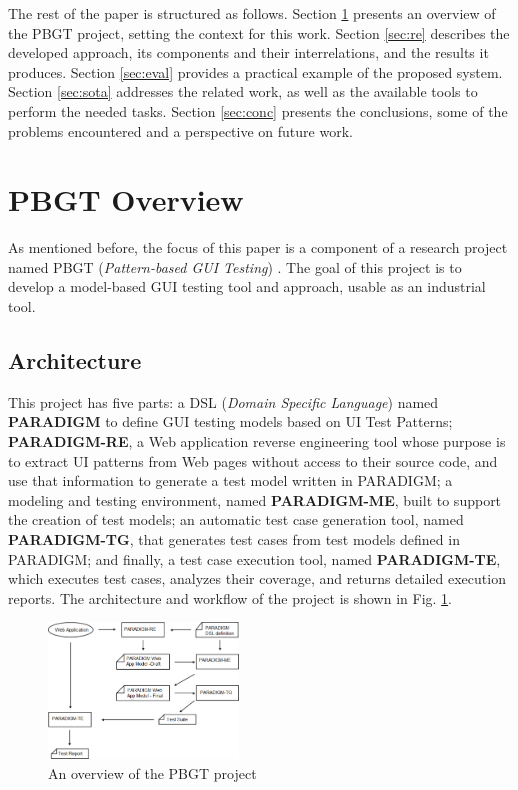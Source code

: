 \documentclass[conference]{IEEEtran}
\begin{document}
The rest of the paper is structured as follows. Section \ref{sec:pbgt} presents an overview of the PBGT project, setting the context for this work.  Section \ref{sec:re} describes the developed approach, its components and  their interrelations, and the results it produces. Section \ref{sec:eval} provides a practical example of the proposed system. Section \ref{sec:sota} addresses the related work, as well as the available tools to perform the needed tasks. Section \ref{sec:conc} presents the conclusions, some of the problems encountered and a perspective on future work. 

\section{PBGT Overview}\label{sec:pbgt}

As mentioned before, the focus of this paper is a component of a research project named PBGT (\textit{Pattern-based GUI Testing}) \cite{moreira2013pattern}. The goal of this project is to develop a model-based GUI testing tool and approach, usable as an industrial tool.

\subsection{Architecture}
This project has five parts: a DSL (\textit{Domain Specific Language}) named \textbf{PARADIGM} to define GUI testing models based on UI Test Patterns; \textbf{PARADIGM-RE}, a Web application reverse engineering tool whose purpose is to extract UI patterns from Web pages without access to their source code, and use that information to generate a test model written in PARADIGM; a modeling and testing environment, named \textbf{PARADIGM-ME}, built to support the creation of test models; an automatic test case generation tool, named \textbf{PARADIGM-TG}, that generates test cases from test models defined in PARADIGM; and finally, a test case execution tool, named \textbf{PARADIGM-TE}, which executes test cases, analyzes their coverage, and returns detailed execution reports. The architecture and workflow of the project is shown in Fig. \ref{fig:pbgt}.

\begin{figure}[!htb]
\centering
\includegraphics[width=0.45\textwidth]{pbgt}
\caption{An overview of the PBGT project}
\label{fig:pbgt}
\end{figure}
\end{document}
